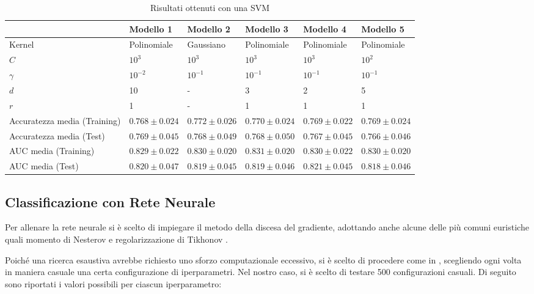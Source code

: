 \documentclass[a4paper]{article}
\begin{document}
\begin{table}[h]
\centering
\begingroup
\setlength{\tabcolsep}{5pt} %
\renewcommand{\arraystretch}{1.8} %
\begin{tabularx}{\textwidth}{|h|X|X|X|X|X|}
\hline
{}
& \textbf{Modello 1} & \textbf{Modello 2} & \textbf{Modello 3} & \textbf{Modello 4} & \textbf{Modello 5} \\ \hline
Kernel & Polinomiale & Gaussiano & Polinomiale & Polinomiale & Polinomiale \\ \hline
$C$ & $10^{3}$ & $10^{3}$ & $10^{3}$ & $10^{3}$ & $10^{2}$ \\ \hline
$\gamma$ & $10^{-2}$ & $10^{-1}$ & $10^{-1}$ & $10^{-1}$ & $10^{-1}$ \\ \hline
$d$ & 10 & - & 3 & 2 & 5 \\ \hline
$r$ & 1 & - & 1 & 1 & 1 \\ \hline
Accuratezza media (Training) & $0.768 \pm 0.024$ & $0.772 \pm 0.026$ & $0.770 \pm 0.024$ & $0.769 \pm 0.022$ & $0.769 \pm 0.024$ \\ \hline
Accuratezza media (Test) & $\mathbf{0.769} \pm 0.045$ & $0.768 \pm 0.049$ & $0.768 \pm 0.050$ & $0.767 \pm 0.045$ & $0.766 \pm 0.046$ \\ \hline
AUC media (Training) & $0.829 \pm 0.022$ & $0.830 \pm 0.020$ & $0.831 \pm 0.020$ & $0.830 \pm 0.022$ & $0.830 \pm 0.020$ \\ \hline
AUC media (Test) & $0.820 \pm 0.047$ & $0.819 \pm 0.045$ & $0.819 \pm 0.046$ & $0.821 \pm 0.045$ & $0.818 \pm 0.046$ \\ \hline
\end{tabularx}
\endgroup
\caption{Risultati ottenuti con una SVM}
\label{tab:svm}
\end{table}

\subsection{Classificazione con Rete Neurale}

Per allenare la rete neurale si è scelto di impiegare il metodo della discesa del gradiente, adottando anche alcune delle più comuni euristiche quali momento di Nesterov e regolarizzazione di Tikhonov \cite{dlbook}.

Poiché una ricerca esaustiva avrebbe richiesto uno sforzo computazionale eccessivo, si è scelto di procedere come in \cite{randsearch}, scegliendo ogni volta in maniera casuale una certa configurazione di iperparametri. Nel nostro caso, si è scelto di testare 500 configurazioni casuali. Di seguito sono riportati i valori possibili per ciascun iperparametro:
\end{document}
